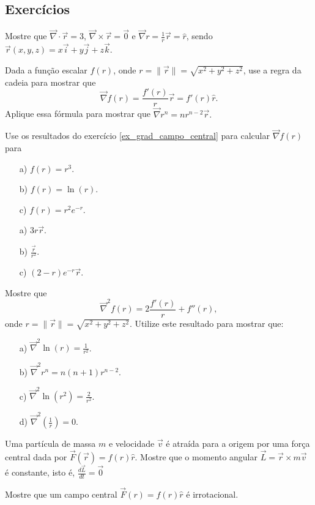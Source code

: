 \subsection*{Exercícios}
\begin{exer}
Mostre que $\vec{\nabla}\cdot\vec{r}=3$, $\vec{\nabla}\times\vec{r}=\vec{0}$ e $\vec{\nabla}r=\frac{1}{r}\vec{r}=\hat{r}$, sendo $\vec{r}(x,y,z)=x\vec{i}+y\vec{j}+z\vec{k}$.
\end{exer}
\begin{exer}\label{ex_grad_campo_central}
Dada a função escalar $f(r)$, onde $r=\|\vec{r}\|=\sqrt{x^2+y^2+z^2}$, use a regra da cadeia para mostrar que
$$
\vec{\nabla}f(r)=\frac{f'(r)}{r}\vec{r}=f'(r)\hat{r}.
$$
Aplique essa fórmula para mostrar que $\vec{\nabla}r^n=nr^{n-2}\vec{r}.$
\end{exer}
\begin{exer}Use os resultados do exercício \ref{ex_grad_campo_central} para calcular $\vec{\nabla}f(r)$ para
\begin{itemize}
 \item[a)] $f(r)=r^3$.
 \item[b)] $f(r)=\ln(r)$.
 \item[c)] $f(r)=r^2e^{-r}$.
\end{itemize}
\end{exer}
\begin{resp}
\begin{itemize}
 \item[a)] $3r\vec{r}$.
 \item[b)] $\frac{\vec{r}}{r^2}$.
 \item[c)] $(2-r)e^{-r}\vec{r}$.
\end{itemize}
\end{resp}
\begin{exer}
 Mostre que
 $$
 \vec{\nabla}^2f(r)=2\frac{f'(r)}{r}+f''(r),
 $$
 onde $r=\|\vec{r}\|=\sqrt{x^2+y^2+z^2}$. Utilize este resultado para mostrar que:
 \begin{itemize}
  \item[a)] $\vec{\nabla}^2\ln(r) =\frac{1}{r^2}$.
  \item[b)] $\vec{\nabla}^2r^n =n(n+1)r^{n-2}$.
  \item[c)] $\vec{\nabla}^2\ln(r^2) =\frac{2}{r^2}$.
    \item[d)] $\vec{\nabla}^2\left(\frac{1}{r}\right) =0$.
 \end{itemize}
\end{exer}


\begin{exer}
 Uma partícula de massa $m$ e velocidade $\vec{v}$ é atraída para a origem por uma força central dada por $\vec{F}(\vec{r})=f(r)\hat{r}$. Mostre que o momento angular $\vec{L}=\vec{r}\times m\vec{v}$ é constante, isto é, $\frac{d\vec{L}}{dt}=\vec{0}$
\end{exer}
\begin{exer}
 Mostre que um campo central $\vec{F}(r)=f(r)\hat{r}$ é irrotacional.
\end{exer}




